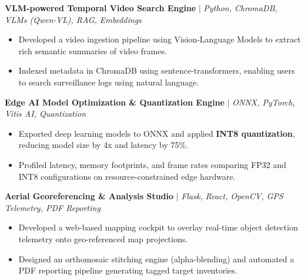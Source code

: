 \documentclass[a4paper,11pt]{article}
\begin{document}
\vspace{4pt}
\textbf{\color{secondary}VLM-powered Temporal Video Search Engine} $|$ \textit{Python, ChromaDB, VLMs (Qwen-VL), RAG, Embeddings} \hfill \href{https://github.com/Arihant3704/aerial-image/tree/main/ai_projects/vlm_event_logger}{\color{linkblue}\faGithub}
\begin{itemize}
    \item Developed a video ingestion pipeline using Vision-Language Models to extract rich semantic summaries of video frames.
    \item Indexed metadata in ChromaDB using sentence-transformers, enabling users to search surveillance logs using natural language.
\end{itemize}

\vspace{4pt}
\textbf{\color{secondary}Edge AI Model Optimization \& Quantization Engine} $|$ \textit{ONNX, PyTorch, Vitis AI, Quantization} \hfill \href{https://github.com/Arihant3704/aerial-image/tree/main/ai_projects/edge_quantizer}{\color{linkblue}\faGithub}
\begin{itemize}
    \item Exported deep learning models to ONNX and applied \textbf{INT8 quantization}, reducing model size by 4x and latency by 75\%.
    \item Profiled latency, memory footprints, and frame rates comparing FP32 and INT8 configurations on resource-constrained edge hardware.
\end{itemize}

\vspace{4pt}
\textbf{\color{secondary}Aerial Georeferencing \& Analysis Studio} $|$ \textit{Flask, React, OpenCV, GPS Telemetry, PDF Reporting} \hfill \href{https://github.com/Arihant3704/aerial-image}{\color{linkblue}\faGithub}
\begin{itemize}
    \item Developed a web-based mapping cockpit to overlay real-time object detection telemetry onto geo-referenced map projections.
    \item Designed an orthomosaic stitching engine (alpha-blending) and automated a PDF reporting pipeline generating tagged target inventories.
\end{itemize}
\vspace{3pt}

\end{document}
